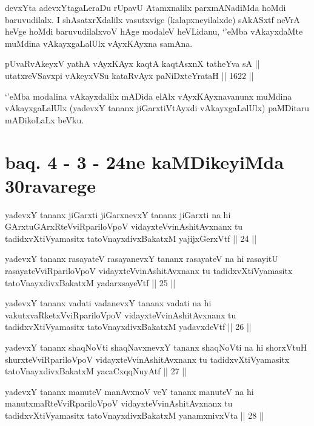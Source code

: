 \begin{artha}
devxYta adevxYtagaLeraDu rUpavU Atamxnalilx parxmANadiMda hoMdi baruvudilalx. I shAsatxrXdalilx vasutxvige (kalapxneyilalxde) sAkASxtf neVrA heVge hoMdi baruvudilalxvoV hAge modaleV heVLidanu, `\stext'eMba vAkayxdaMte muMdina vAkayxgaLalUlx vAyxKAyxna samAna.
\end{artha}

\begin{shl}
pUvaRvAkeyxV yathA vAyxKAyx kaqtA kaqtAsxnX tatheYva sA || \\
utatxreVSavxpi vAkeyxVSu kataRvAyx paNiDxteYrataH ||  1622 ||  
\end{shl}

\begin{artha}
`\stext'eMba modalina vAkayxdalilx mADida elAlx vAyxKAyxnavanunx muMdina vAkayxgaLalUlx (yadevxY tananx jiGarxtiVtAyxdi vAkayxgaLalUlx) paMDitaru mADikoLaLx beVku.  
\end{artha}

\section*{baq. 4 - 3 - 24ne kaMDikeyiMda 30ravarege}

\begin{shl}
yadevxY tananx jiGarxti jiGarxnevxY tananx jiGarxti na hi GArxtuGArxRteVviRpariloVpoV vidayxteV\s vinAshitAvxnanx tu tadidxvXtiVyamasitx tatoV\s nayxdivxBakatxM yajijxGerxVtf || 24 ||
\end{shl}

\begin{shl}
yadevxY tananx rasayateV rasayanevxY tananx rasayateV na hi rasayitU rasayateVviRpariloVpoV vidayxteV\s vinAshitAvxnanx tu tadidxvXtiVyamasitx tatoV\s nayxdivxBakatxM yadarxsayeVtf || 25 ||
\end{shl}

\begin{shl}
yadevxY tananx vadati vadanevxY tananx vadati na hi vakutxvaRketxVviRpariloVpoV vidayxteV\s vinAshitAvxnanx tu tadidxvXtiVyamasitx tatoV\s nayxdivxBakatxM yadavxdeVtf || 26 ||
\end{shl}

\begin{shl}
yadevxY tananx shaqNoVti shaqNavxnevxY tananx shaqNoVti na hi shorxVtuH shurxteVviRpariloVpoV vidayxteV\s vinAshitAvxnanx tu tadidxvXtiVyamasitx tatoV\s nayxdivxBakatxM yacaCxqqNuyAtf || 27 ||
\end{shl}

\begin{shl}
yadevxY tananx manuteV manAvxnoV veY tananx manuteV na hi manutxmaRteVviRpariloVpoV vidayxteV\s vinAshitAvxnanx tu tadidxvXtiVyamasitx tatoV\s nayxdivxBakatxM yanamxnivxVta || 28 ||
\end{shl}

